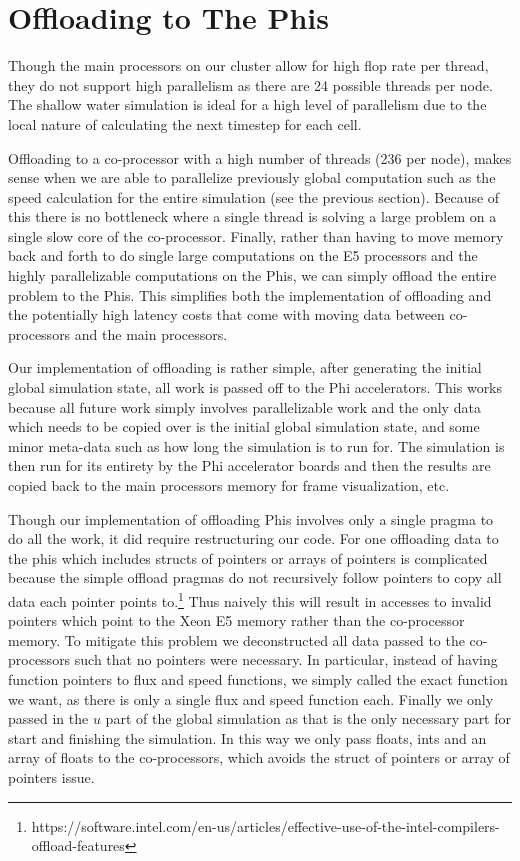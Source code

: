 \documentclass[11pt]{article}
\begin{document}
\section{Offloading to The Phis}

Though the main processors on our cluster allow for high flop rate per thread, they do not support high parallelism as there are 24 possible threads per node. The shallow water simulation is ideal for a high level of parallelism due to the local nature of calculating the next timestep for each cell.

Offloading to a co-processor with a high number of threads (236 per node), makes sense when we are able to parallelize previously global computation such as the speed calculation for the entire simulation (see the previous section). Because of this there is no bottleneck where a single thread is solving a large problem on a single slow core of the co-processor. Finally, rather than having to move memory back and forth to do single large computations on the E5 processors and the highly parallelizable computations on the Phis, we can simply offload the entire problem to the Phis. This simplifies both the implementation of offloading and the potentially high latency costs that come with moving data between co-processors and the main processors.

Our implementation of offloading is rather simple, after generating the initial global simulation state, all work is passed off to the Phi accelerators. This works because all future work simply involves parallelizable work and the only data which needs to be copied over is the initial global simulation state, and some minor meta-data such as how long the simulation is to run for. The simulation is then run for its entirety by the Phi accelerator boards and then the results are copied back to the main processors memory for frame visualization, etc.

Though our implementation of offloading Phis involves only a single pragma to do all the work, it did require restructuring our code. For one offloading data to the phis which includes structs of pointers or arrays of pointers is complicated because the simple offload pragmas do not recursively follow pointers to copy all data each pointer points to.\footnote{https://software.intel.com/en-us/articles/effective-use-of-the-intel-compilers-offload-features} Thus naively this will result in accesses to invalid pointers which point to the Xeon E5 memory rather than the co-processor memory. To mitigate this problem we deconstructed all data passed to the co-processors such that no pointers were necessary. In particular, instead of having function pointers to flux and speed functions, we simply called the exact function we want, as there is only a single flux and speed function each. Finally we only passed in the $u$ part of the global simulation as that is the only necessary part for start and finishing the simulation. In this way we only pass floats, ints and an array of floats to the co-processors, which avoids the struct of pointers or array of pointers issue.
\end{document}
